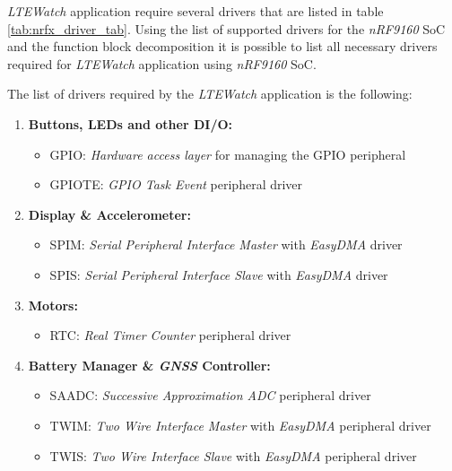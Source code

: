 \documentclass[report.tex]{subfiles}
\begin{document}
\textit{LTEWatch} application require several drivers that are listed in table \ref{tab:nrfx_driver_tab}. Using the list of supported drivers for the \textit{nRF9160} SoC and the function block decomposition it is possible to list all necessary drivers required for \textit{LTEWatch} application using \textit{nRF9160} SoC.\\

\pagebreak

\begin{flushleft}
 The list of drivers required by the \textit{LTEWatch} application is the following:
\end{flushleft}
 
\begin{enumerate}
\item \textbf{Buttons, LEDs and other DI/O:}
\begin{itemize}
\item GPIO: \textit{Hardware access layer} for managing the GPIO peripheral
\item GPIOTE: \textit{GPIO Task Event} peripheral driver
\end{itemize}

\item \textbf{Display \& Accelerometer:}
\begin{itemize}
\item SPIM: \textit{Serial Peripheral Interface Master} with \textit{EasyDMA} driver
\item SPIS: \textit{Serial Peripheral Interface Slave} with \textit{EasyDMA} driver
\end{itemize}

\item \textbf{Motors:}
\begin{itemize}
\item RTC: \textit{Real Timer Counter} peripheral driver
\end{itemize}

\item \textbf{Battery Manager \& \textit{GNSS} Controller:}
\begin{itemize}
\item SAADC: \textit{Successive Approximation ADC} peripheral driver
\item TWIM: \textit{Two Wire Interface Master} with \textit{EasyDMA} peripheral driver
\item TWIS: \textit{Two Wire Interface Slave} with \textit{EasyDMA} peripheral driver
\end{itemize}


\end{enumerate}
\end{document}
